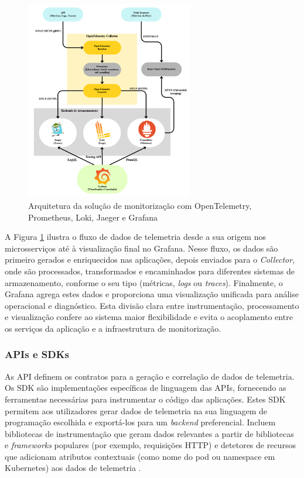 \begin{figure}[H]
    \centering
    \includegraphics[width=0.65\textwidth]{images/Diagramas/arquitetura_da_solucao.png}
    \caption{Arquitetura da solução de monitorização com OpenTelemetry, Prometheus, Loki, Jaeger e Grafana}
    \label{fig:otel_arch}
\end{figure}

A Figura \ref{fig:otel_arch} ilustra o fluxo de dados de telemetria desde a sua origem nos microsserviços até à visualização final no Grafana. Nesse fluxo, os dados são primeiro gerados e enriquecidos nas aplicações, depois enviados para o \textit{Collector}, onde são processados, transformados e encaminhados para diferentes sistemas de armazenamento, conforme o seu tipo (métricas, \textit{logs} ou \textit{traces}). Finalmente, o Grafana agrega estes dados e proporciona uma visualização unificada para análise operacional e diagnóstico. Esta divisão clara entre instrumentação, processamento e visualização confere ao sistema maior flexibilidade e evita o acoplamento entre os serviços da aplicação e a infraestrutura de monitorização.

\subsubsection{APIs e SDKs}
As API definem os contratos para a geração e correlação de dados de telemetria. Os SDK são implementações específicas de linguagem das APIs, fornecendo as ferramentas necessárias para instrumentar o código das aplicações. Estes SDK permitem aos utilizadores gerar dados de telemetria na sua linguagem de programação escolhida e exportá-los para um \textit{backend} preferencial. Incluem bibliotecas de instrumentação que geram dados relevantes a partir de bibliotecas e \textit{frameworks} populares (por exemplo, requisições HTTP) e detetores de recursos que adicionam atributos contextuais (como nome do pod ou namespace em Kubernetes) aos dados de telemetria \cite{opentelemetry_docs,Thakur2022}.

